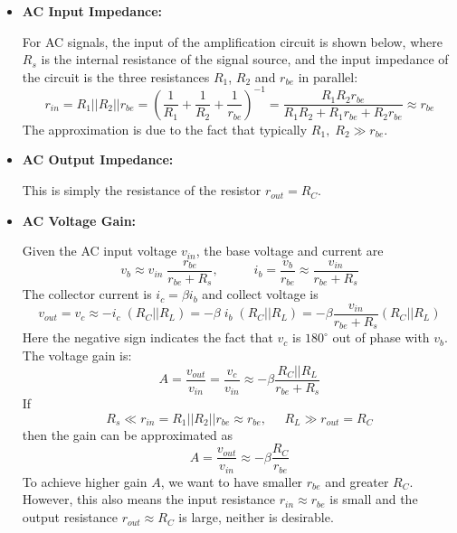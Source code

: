 \documentclass{article}
\begin{document}
\begin{itemize}
\item {\bf AC Input Impedance:} 

  For AC signals, the input of the amplification circuit is shown below, 
  where $R_s$ is the internal resistance of the signal source, and the 
  input impedance of the circuit is the three resistances $R_1$, $R_2$ and 
  $r_{be}$ in parallel:
  \begin{equation}	
  r_{in}=R_1||R_2||r_{be}
  =\left(\frac{1}{R_1}+\frac{1}{R_2}+\frac{1}{r_{be}}\right)^{-1}
  =\frac{R_1 R_2 r_{be}}{R_1R_2+R_1r_{be}+R_2r_{be}}\approx r_{be}	
  \end{equation}
  The approximation is due to the fact that typically $R_1,\;R_2\gg r_{be}$.
\item {\bf AC Output Impedance:} 

  This is simply the resistance of the resistor $r_{out}=R_C$.

\item {\bf AC Voltage Gain:} 

  Given the AC input voltage $v_{in}$, the base voltage and current are
  \begin{equation}
  v_b \approx v_{in}\;\frac{r_{be}}{r_{be}+R_s},\;\;\;\;\;\;\;\;\;\;
  i_b=\frac{v_b}{r_{be}}\approx \frac{v_{in}}{r_{be}+R_s}
  \end{equation}
  The collector current is $i_c=\beta i_b$ and collect voltage is
  \begin{equation}
  v_{out}=v_c\approx -i_c\;(R_C||R_L) = -\beta\;i_b\;(R_C||R_L)	
  =-\beta \frac{v_{in}}{r_{be}+R_s} (R_C||R_L)
  \end{equation}
  Here the negative sign indicates the fact that $v_c$ is $180^\circ$ out of
  phase with $v_b$.
  The voltage gain is:
  \begin{equation}
  A=\frac{v_{out}}{v_{in}}=\frac{v_c}{v_{in}}
  \approx -\beta \frac{R_C||R_L}{r_{be}+R_s}
  \end{equation}
  If 
  \begin{equation}	
  R_s\ll r_{in}=R_1||R_2||r_{be} \approx r_{be},\;\;\;\;\;R_L\gg r_{out}=R_C 
  \end{equation}
  then the gain can be approximated as
  \begin{equation}
  A=\frac{v_{out}}{v_{in}}\approx -\beta \frac{R_C}{r_{be}}	
  \end{equation}
  To achieve higher gain $A$, we want to have smaller $r_{be}$ and 
  greater $R_C$. However, this also means the input resistance
  $r_{in}\approx r_{be}$ is small and the output resistance 
  $r_{out}\approx R_C$ is large, neither is desirable.


\end{itemize}
\end{document}

